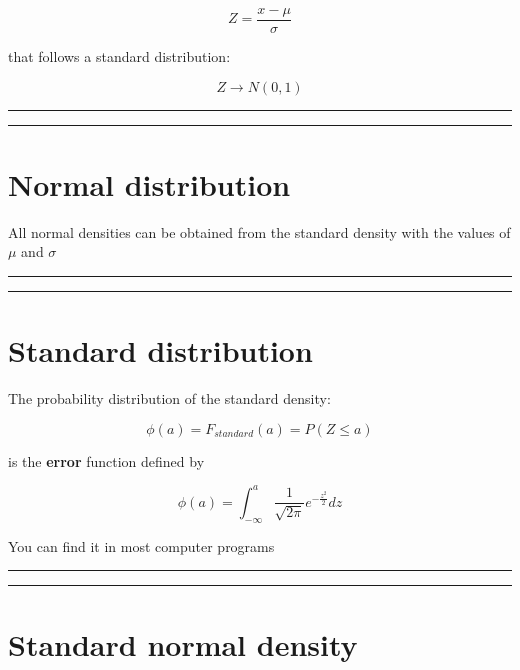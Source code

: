 \documentclass[
]{book}
\begin{document}
\[Z=\frac{x-\mu}{\sigma}\]

that follows a standard distribution:

\[Z \rightarrow N(0,1)\]

\begin{center}\rule{0.5\linewidth}{0.5pt}\end{center}

\begin{center}\rule{0.5\linewidth}{0.5pt}\end{center}

\hypertarget{normal-distribution-6}{%
\section{Normal distribution}\label{normal-distribution-6}}

All normal densities can be obtained from the standard density with the values of \(\mu\) and \(\sigma\)

\begin{center}\rule{0.5\linewidth}{0.5pt}\end{center}

\begin{center}\rule{0.5\linewidth}{0.5pt}\end{center}

\hypertarget{standard-distribution}{%
\section{Standard distribution}\label{standard-distribution}}

The probability distribution of the standard density:

\[\phi(a)=F_{standard}(a)=P(Z \leq a)\]

is the \textbf{error} function defined by

\[\phi(a)=\int_{-\infty}^{a} \frac{1}{\sqrt{2\pi}}e^{-\frac{z^2}{2}} dz\]

You can find it in most computer programs

\begin{center}\rule{0.5\linewidth}{0.5pt}\end{center}

\begin{center}\rule{0.5\linewidth}{0.5pt}\end{center}

\hypertarget{standard-normal-density-3}{%
\section{Standard normal density}\label{standard-normal-density-3}}
\end{document}
